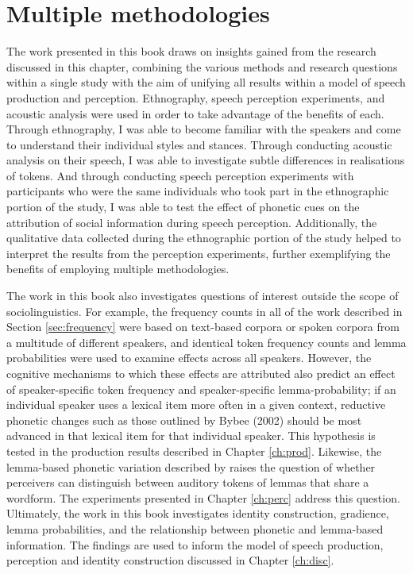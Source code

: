  \section{Multiple methodologies}
The work presented in this book draws on insights gained from the research discussed in this chapter, combining the various methods and research questions within a single study with the aim of unifying all results within a model of speech production and perception.  Ethnography, speech perception experiments, and acoustic analysis were used in order to take advantage of the benefits of each.  Through ethnography, I was able to become familiar with the speakers and come to understand their individual styles and stances.  Through conducting acoustic analysis on their speech, I was able to investigate subtle differences in realisations of tokens.  And through conducting speech perception experiments with participants who were the same individuals who took part in the ethnographic portion of the study, I was able to test the effect of phonetic cues on the attribution of social information during speech perception.  Additionally, the qualitative data collected during the ethnographic portion of the study helped to interpret the results from the perception experiments, further exemplifying the benefits of employing multiple methodologies.

The work in this book also investigates questions of interest outside the scope of sociolinguistics.  For example, the frequency counts in all of the work described in Section \ref{sec:frequency} were based on text-based corpora or spoken corpora from a multitude of different speakers, and identical token frequency counts and lemma probabilities were used to examine effects across all speakers.  However, the cognitive mechanisms to which these effects are attributed also predict an effect of speaker-specific token frequency and speaker-specific lemma-probability; if an individual speaker uses a lexical item more often in a given context, reductive phonetic changes such as those outlined by Bybee (2002) should be most advanced in that lexical item for that individual speaker.  This hypothesis is tested in the production results described in Chapter \ref{ch:prod}.  Likewise, the lemma-based phonetic variation described by  raises the question of whether perceivers can distinguish between auditory tokens of lemmas that share a wordform.  The experiments presented in Chapter \ref{ch:perc} address this question. Ultimately, the work in this book investigates identity construction, gradience, lemma probabilities, and the relationship between phonetic and lemma-based information.  The findings are used to inform the model of speech production, perception and identity construction discussed in Chapter \ref{ch:disc}.  

